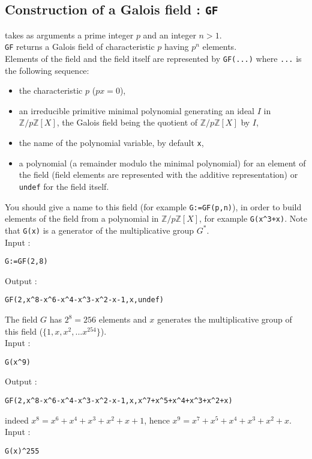 \documentclass[a4paper,11pt]{book}
\newcommand{\Z}{{\mathbb{Z}}}
\begin{document}
\subsection{Construction of a Galois field : {\tt GF}}
 takes as arguments a prime integer $p$ 
and an integer $n>1$.\\
{\tt GF} returns a Galois field of characteristic $p$ having $p^n$
elements.\\
Elements of the field and the field itself
are represented by {\tt GF(...)} where {\tt ...} is the following 
sequence:
\begin{itemize}
\item the characteristic $p$ ($px=0$),
\item an irreducible primitive minimal polynomial generating an
ideal $I$ in $\Z/p\Z[X]$, the Galois field being the quotient
of $\Z/p\Z[X]$ by $I$,
\item the name of the polynomial variable, by default {\tt x},
\item a polynomial (a remainder modulo the minimal polynomial) 
for an element of the field
(field elements are represented with the additive representation)
or {\tt undef} for the field itself.
\end{itemize}
You should give a name to this field (for example {\tt G:=GF(p,n)}),
in order to build elements of the field from a polynomial in
$\Z/p\Z[X]$, for example {\tt G(x\verb|^|3+x)}. Note that {\tt G(x)}
is a generator of the multiplicative group {\tt $G^*$}.\\
Input :
\begin{center}{\tt G:=GF(2,8)}\end{center}
Output :
\begin{center}{\tt GF(2,x\verb|^|8-x\verb|^|6-x\verb|^|4-x\verb|^|3-x\verb|^|2-x-1,x,undef)}\end{center}
The field $G$ has $2^8=256$ elements and  
$x$ generates the multiplicative group
of this field  ($\{ 1,x,x^2,...x^{254} \}$).\\
Input :
\begin{center}{\tt G(x\verb|^|9)}\end{center}
Output :
\begin{center}{\tt GF(2,x\verb|^|8-x\verb|^|6-x\verb|^|4-x\verb|^|3-x\verb|^|2-x-1,x,x\verb|^|7+x\verb|^|5+x\verb|^|4+x\verb|^|3+x\verb|^|2+x)}\end{center}
indeed $x^8=x^6+x^4+x^3+x^2+x+1$, hence $x^9=x^7+x^5+x^4+x^3+x^2+x$.\\
Input :
\begin{center}{\tt G(x)\verb|^|255}\end{center}
\end{document}
